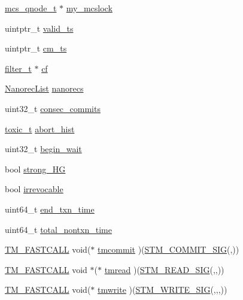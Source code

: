 \begin{DoxyCompactItemize}
\item 
\hyperlink{structmcs__qnode__t}{mcs\-\_\-qnode\-\_\-t} $\ast$ \hyperlink{structstm_1_1TxThread_ad69c93d85ee12c06ee29626425111e09}{my\-\_\-mcslock}
\item 
uintptr\-\_\-t \hyperlink{structstm_1_1TxThread_a9a38bf30ab011a2ae45c14ae3cfa6c97}{valid\-\_\-ts}
\item 
uintptr\-\_\-t \hyperlink{structstm_1_1TxThread_af932ae4f9276e60c0ecfbb6de19c9d44}{cm\-\_\-ts}
\item 
\hyperlink{namespacestm_a34196fa5dc72823aaaa307a6e353704e}{filter\-\_\-t} $\ast$ \hyperlink{structstm_1_1TxThread_a98cf1b91ba5771dfa98132a2c5486ec6}{cf}
\item 
\hyperlink{namespacestm_a5a70108dbd954a2634cf59d668ea8241}{Nanorec\-List} \hyperlink{structstm_1_1TxThread_a21ab6ca34667f25408cd8b81bd9b6be0}{nanorecs}
\item 
uint32\-\_\-t \hyperlink{structstm_1_1TxThread_a02b7659acba4caf37d775c436fe691ad}{consec\-\_\-commits}
\item 
\hyperlink{namespacestm_a1a3981a9b82aa51afd56d191ca1e3984}{toxic\-\_\-t} \hyperlink{structstm_1_1TxThread_a985c061817534ccbab8a89ca0a34a52f}{abort\-\_\-hist}
\item 
uint32\-\_\-t \hyperlink{structstm_1_1TxThread_ade9057c9a92ce6b644aea8719c932de6}{begin\-\_\-wait}
\item 
bool \hyperlink{structstm_1_1TxThread_af4130eccc384e6c423fd29797c4a8aba}{strong\-\_\-\-H\-G}
\item 
bool \hyperlink{structstm_1_1TxThread_a4745b95b7c25487afc954076556842df}{irrevocable}
\item 
uint64\-\_\-t \hyperlink{structstm_1_1TxThread_a18178949e3e83c05ac7250a34f0a3c3b}{end\-\_\-txn\-\_\-time}
\item 
uint64\-\_\-t \hyperlink{structstm_1_1TxThread_ad217a99774ad79e3d581b008ef067991}{total\-\_\-nontxn\-\_\-time}
\item 
\hyperlink{platform_8hpp_a8b5d728e6eed8f368f9966f637d2f719}{T\-M\-\_\-\-F\-A\-S\-T\-C\-A\-L\-L} void($\ast$ \hyperlink{structstm_1_1TxThread_a98f7df70804772d4205354933bd76b25}{tmcommit} )(\hyperlink{include_2stm_2macros_8hpp_a1b8304eb1082517c7dc31f3534b72343}{S\-T\-M\-\_\-\-C\-O\-M\-M\-I\-T\-\_\-\-S\-I\-G}(,))
\item 
\hyperlink{platform_8hpp_a8b5d728e6eed8f368f9966f637d2f719}{T\-M\-\_\-\-F\-A\-S\-T\-C\-A\-L\-L} void $\ast$($\ast$ \hyperlink{structstm_1_1TxThread_ae294456a4d6150a2e14ccedaaf9cf0bb}{tmread} )(\hyperlink{include_2stm_2macros_8hpp_abae784c2079f9c1ecc6a72cfeb795db4}{S\-T\-M\-\_\-\-R\-E\-A\-D\-\_\-\-S\-I\-G}(,,))
\item 
\hyperlink{platform_8hpp_a8b5d728e6eed8f368f9966f637d2f719}{T\-M\-\_\-\-F\-A\-S\-T\-C\-A\-L\-L} void($\ast$ \hyperlink{structstm_1_1TxThread_ac250db343a00b5b76d56202e2d95ab84}{tmwrite} )(\hyperlink{include_2stm_2macros_8hpp_a05836a7c31fa89c1c84557f4691c44d3}{S\-T\-M\-\_\-\-W\-R\-I\-T\-E\-\_\-\-S\-I\-G}(,,,))
\end{DoxyCompactItemize}

